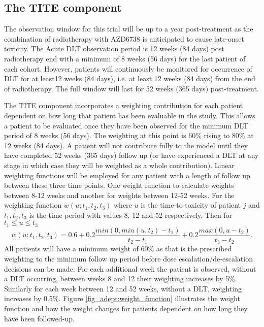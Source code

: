 \subsection{The TITE component}
\label{adept:The-TITE-component}

The observation window for this trial will be up to a year post-treatment as the combination of radiotherapy with AZD6738 is anticipated to cause late-onset toxicity. The Acute DLT observation period is 12 weeks (84 days) post radiotherapy end with a minimum of 8 weeks (56 days) for the last patient of each cohort. However, patients will continuously be monitored for occurrence of DLT for at least12 weeks (84 days), i.e. at least 12 weeks (84 days) from the end of radiotherapy. The full window will last for 52 weeks (365 days) post-treatment.

The TITE component incorporates a weighting contribution for each patient dependent on how long that patient has been evaluable in the study. This allows a patient to be evaluated once they have been observed for the minimum DLT period of 8 weeks (56 days). The weighting at this point is 60\% rising to 80\% at 12 weeks (84 days). A patient will not contribute fully to the model until they have completed 52 weeks (365 days) follow up (or have experienced a DLT at any stage in which case they will be weighted as a whole contribution). Linear weighting functions will be employed for any patient with a length of follow up between these three time points. One weight function to calculate weights between 8-12 weeks and another for weights between 12-52 weeks. For the weighting function $w(u;t_1, t_2, t_3)$ where $u$ is the time-to-toxicity of patient $j$ and $t_1, t_2, t_3$ is the time period with values 8, 12 and 52 respectively. Then for $t_1 \leq u \leq t_3$
\begin{equation}
w(u;t_1,t_2,t_3) = 0.6 + 0.2\frac{min(0, min(u, t_2) - t_1)}{t_2 - t_1} + 0.2\frac{max(0, u - t_2)}{t_3-t_2}.
\end{equation} 
All patients will have a minimum weight of 60\% as that is the prescribed weighting to the  minimum follow up period before dose escalation/de-escalation decisions can be made. For each additional week the patient is observed, without a DLT occurring, between weeks 8 and 12 their weighting increases by 5\%. Similarly for each week between 12 and 52 weeks, without a DLT, weighting increases by 0.5\%. Figure \ref{fig_adept:weight_function} illustrates the weight function and how the weight changes for patients dependent on how long they have been followed-up.   


